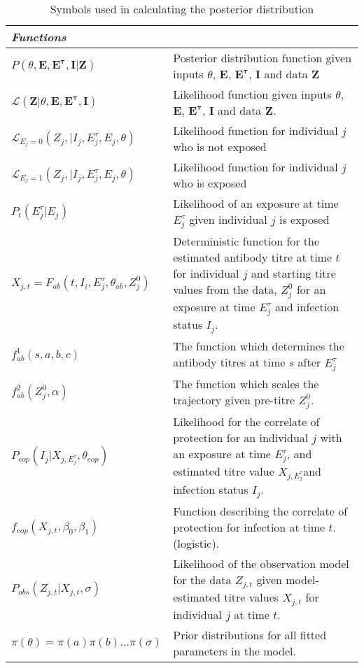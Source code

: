 \documentclass{article}
\begin{document}
\begin{table}[ht]
\begin{tabular}{| l | p{} |}
       \textit{Functions} & \\
              \hline
       	$P( \theta, \mathbf{E}, \mathbf{E^\tau}, \mathbf{I}  | \mathbf{Z})$ & Posterior distribution function given inputs $\theta$, $\mathbf{E}$, $\mathbf{E^\tau}$, $\mathbf{I}$ and data $\mathbf{Z}$\\    \hline
       	$\mathcal{L}( \mathbf{Z} | \theta, \mathbf{E}, \mathbf{E^\tau}, \mathbf{I} )$ & Likelihood function given inputs $\theta$, $\mathbf{E}$, $\mathbf{E^\tau}$, $\mathbf{I}$ and data $\mathbf{Z}$. \\         \hline
        $\mathcal{L}_{E_j = 0}(Z_j, | I_j, E^\tau_j, E_j, \theta)$ & Likelihood function for individual $j$ who is not exposed \\   \hline
       	$\mathcal{L}_{E_j = 1}(Z_j, | I_j, E^\tau_j, E_j, \theta)$ & Likelihood function for individual $j$ who is exposed \\   \hline
	$P_t(E^\tau_j| E_j)$ & Likelihood of an exposure at time $E^\tau_j$ given individual $j$ is exposed  \\   \hline
	$X_{j, t} = F_{ab}( t, I_i,  E_j^\tau, \theta_{ab}, Z^0_j)$ & Deterministic function for the estimated antibody titre at time $t$ for individual $j$ and starting titre values from the data, $Z_j^0$ for an exposure at time $E_j^\tau$ and infection status $I_j$. \\   \hline
	$f^1_{ab}(s, a, b, c)$ & The function which determines the antibody titres at time $s$ after $E_j^\tau$\\  \hline 
	$f^2_{ab}(Z^0_j, \alpha)$ & The function which scales the trajectory given pre-titre $Z^0_j$. \\   \hline
	$P_{cop}(I_j | X_{j, E^\tau_j}, \theta_{cop})$ &  Likelihood for the correlate of protection for an individual $j$ with an exposure at time $E^\tau_j$, and estimated titre value $X_{j, E^\tau_j}$and infection status $I_j$.  \\   \hline
	$f_{cop}(X_{j, t},  \beta_0, \beta_1)$ & Function describing the correlate of protection for infection at time $t$. (logistic).\\  \hline
	$P_{obs}(Z_{j, t} | X_{j, t}, \sigma)$ & Likelihood of the observation model for the data $Z_{j, t}$ given model-estimated titre values $X_{j, t}$ for individual $j$ at time $t$. \\   \hline
	$\pi(\theta) = \pi(a)\pi(b)\dots\pi(\sigma)$ & Prior distributions for all fitted parameters in the model. 
         \hline
    \end{tabular}
    \caption{Symbols used in calculating the posterior distribution}
    \label{tab:ll}
\end{table}
\end{document}
